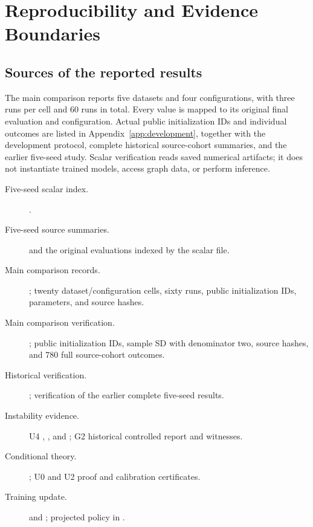 \chapter{Reproducibility and Evidence Boundaries}\label{app:evidence}
\section{Sources of the reported results}
The main comparison reports five datasets and four configurations, with three runs per cell and 60 runs in total. Every value is mapped to its original final evaluation and configuration. Actual public initialization IDs and individual outcomes are listed in Appendix~\ref{app:development}, together with the development protocol, complete historical source-cohort summaries, and the earlier five-seed study. Scalar verification reads saved numerical artifacts; it does not instantiate trained models, access graph data, or perform inference.

\begingroup\small\raggedright
\begin{description}
\item[Five-seed scalar index.] .
\item[Five-seed source summaries.]  and the original evaluations indexed by the scalar file.
\item[Main comparison records.] ; twenty dataset/configuration cells, sixty runs, public initialization IDs, parameters, and source hashes.
\item[Main comparison verification.] ; public initialization IDs, sample SD with denominator two, source hashes, and 780 full source-cohort outcomes.
\item[Historical verification.] ; verification of the earlier complete five-seed results.
\item[Instability evidence.] U4 , , and ; G2 historical controlled report and witnesses.
\item[Conditional theory.] ; U0 and U2 proof and calibration certificates.
\item[Training update.]  and ; projected policy in .
\end{description}
\endgroup

